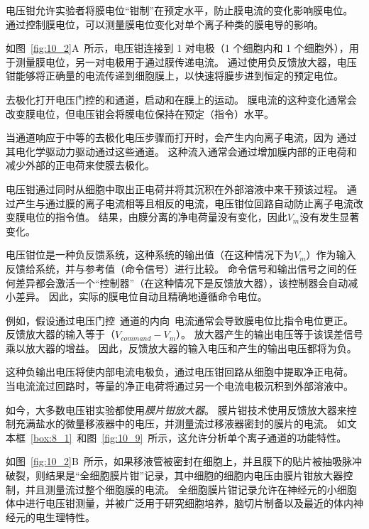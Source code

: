 \begin{proposition}[电压钳技术] \label{box:10_1}
	
	\quad \quad 电压钳允许实验者将膜电位“钳制”在预定水平，防止膜电流的变化影响膜电位。
	通过控制膜电位，可以测量膜电位变化对单个离子种类的膜电导的影响。
	
	\quad \quad 如图~\ref{fig:10_2}A~所示，电压钳连接到 1 对电极（1 个细胞内和 1 个细胞外），用于测量膜电位，另一对电极用于通过膜传递电流。
	通过使用负反馈放大器，电压钳能够将正确量的电流传递到细胞膜上，以快速将膜步进到恒定的预定电位。
	
	\quad \quad 去极化打开电压门控的和通道，启动和在膜上的运动。
	膜电流的这种变化通常会改变膜电位，但电压钳会将膜电位保持在预定（指令）水平。
	
	\quad \quad 当通道响应于中等的去极化电压步骤而打开时，会产生内向离子电流，因为  通过其电化学驱动力驱动通过这些通道。
	这种流入通常会通过增加膜内部的正电荷和减少外部的正电荷来使膜去极化。
	
	\quad \quad 电压钳通过同时从细胞中取出正电荷并将其沉积在外部溶液中来干预该过程。
	通过产生与通过膜的离子电流相等且相反的电流，电压钳位回路自动防止离子电流改变膜电位的指令值。
	结果，由膜分离的净电荷量没有变化，因此$V_m$没有发生显著变化。
	
	\quad \quad 电压钳位是一种负反馈系统，这种系统的输出值（在这种情况下为$V_m$）作为输入反馈给系统，并与参考值（命令信号）进行比较。
	命令信号和输出信号之间的任何差异都会激活一个“控制器”（在这种情况下是反馈放大器），该控制器会自动减小差异。
	因此，实际的膜电位自动且精确地遵循命令电位。
	
	\quad \quad 例如，假设通过电压门控~通道的内向~电流通常会导致膜电位比指令电位更正。
	反馈放大器的输入等于（$V_{command}-V_m$）。
	放大器产生的输出电压等于该误差信号乘以放大器的增益。
	因此，反馈放大器的输入电压和产生的输出电压都将为负。
	
	\quad \quad 这种负输出电压将使内部电流电极负，通过电压钳回路从细胞中提取净正电荷。
	当电流流过回路时，等量的净正电荷将通过另一个电流电极沉积到外部溶液中。
	
	\quad \quad 如今，大多数电压钳实验都使用\textit{膜片钳放大器}。
	膜片钳技术使用反馈放大器来控制充满盐水的微量移液器中的电压，并测量流过移液器密封的膜片的电流。
	如文本框~\ref{box:8_1}~和图~\ref{fig:10_9}~所示，这允许分析单个离子通道的功能特性。
	
	\quad \quad 如图~\ref{fig:10_2}B~所示，如果移液管被密封在细胞上，并且膜下的贴片被抽吸脉冲破裂，则结果是“全细胞膜片钳”记录，其中细胞的细胞内电压由膜片钳放大器控制，并且测量流过整个细胞膜的电流。
	全细胞膜片钳记录允许在神经元的小细胞体中进行电压钳测量，并被广泛用于研究细胞培养，脑切片制备以及最近的体内神经元的电生理特性。
	
\end{proposition}



